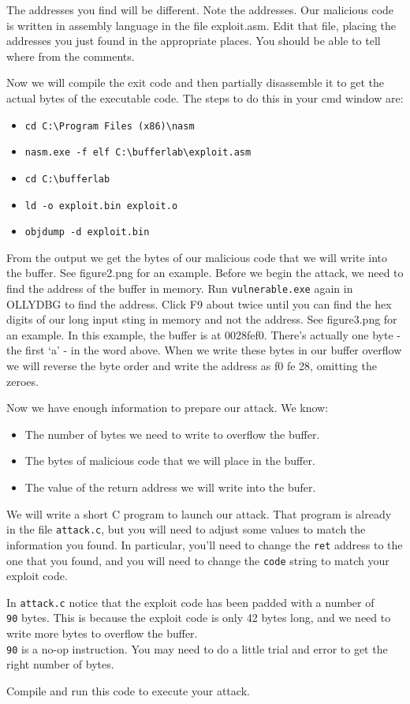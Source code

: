 \documentclass{article}
\begin{document}
The addresses you find will be different.  Note the addresses. Our malicious code is written in assembly language in the file exploit.asm.  Edit that file, placing the addresses you just found in the appropriate places. You should be able to tell where from the comments.

Now we will compile the exit code and then partially disassemble it to get the actual bytes of the executable code.  The steps to do this in your cmd window are:

\begin{itemize}
	\item \texttt{cd C:\textbackslash{}Program Files (x86)\textbackslash{}nasm}
	\item \texttt{nasm.exe  -f elf C:\textbackslash{}bufferlab\textbackslash{}exploit.asm}
	\item \texttt{cd C:\textbackslash{}bufferlab}
	\item \texttt{ld -o exploit.bin exploit.o}
	\item \texttt{objdump -d exploit.bin}
\end{itemize}

From the output we get the bytes of our malicious code that we will write into the buffer.  See figure2.png for an example. Before we begin the attack, we need to find the address of the buffer in memory.  Run \texttt{vulnerable.exe} again in OLLYDBG to find the address. Click F9 about twice until you can find the hex digits of our long input sting in memory and not the address.  See figure3.png for an example.  In this example, the buffer is at
0028fef0.  There's actually one byte - the first `a' - in the word above. When we write these bytes in our buffer overflow we will reverse the byte order and write the address as f0 fe 28, omitting the zeroes.

Now we have enough information to prepare our attack. We know:
\begin{itemize}
	\item The number of bytes we need to write to overflow the buffer.
	\item The bytes of malicious code that we will place in the buffer.
	\item The value of the return address we will write into the bufer.
\end{itemize}

We will write a short C program to launch our attack.  That program is already in the file \texttt{attack.c}, but you will need to adjust some values to match the information you found. In particular, you'll need to change the \texttt{ret} address to the one that you found, and you will need to change the \texttt{code} string to match your exploit code.

In \texttt{attack.c} notice that the exploit code has been padded with a number of \texttt{\\90} bytes. This is because the exploit code is only 42 bytes long, and we need to write more bytes to overflow the buffer.  \texttt{\\90} is a no-op instruction. You may need to do a little trial and error to get the right number of bytes.

Compile and run this code to execute your attack.
\end{document}
